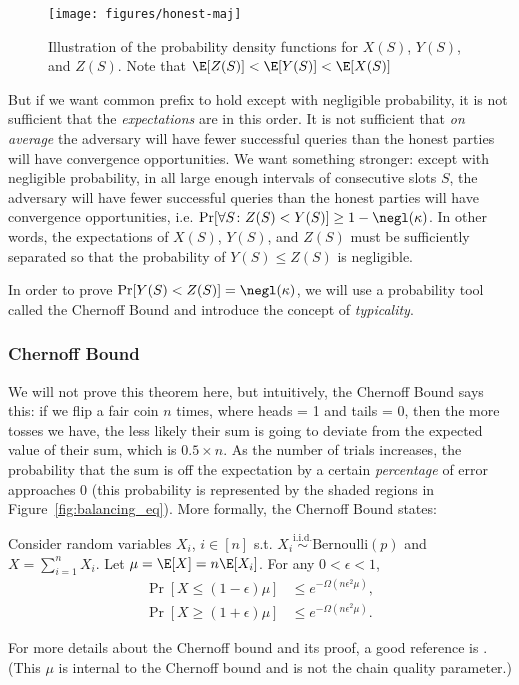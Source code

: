 \begin{figure}[ht]
    \centering
    \texttt{[image: figures/honest-maj]}
    \caption{Illustration of the probability density functions for $X(S)$, $Y(S)$, and $Z(S)$. Note that $\E[Z(S)] < \E[Y(S)] < \E[X(S)]$}
    \label{fig:expectation_gap}
\end{figure}

But if we want common prefix to hold except with negligible probability, it is not sufficient that the \emph{expectations} are in this order. It is not sufficient that \emph{on average} the adversary will have fewer successful queries than the honest parties will have convergence opportunities. We want something stronger: except with negligible probability, in all large enough intervals of consecutive slots $S$, the adversary will have fewer successful queries than the honest parties will have convergence opportunities, i.e. $\Pr[\forall S\colon Z(S) < Y(S)] \geq 1 - \negl(\kappa)$. In other words, the expectations of $X(S)$, $Y(S)$, and $Z(S)$ must be sufficiently separated so that the probability of $Y(S) \leq Z(S)$ is negligible.

In order to prove $\Pr[Y(S) < Z(S)] = \negl(\kappa)$, we will use a probability tool called the Chernoff Bound and introduce the concept of \textit{typicality}.

\subsubsection{Chernoff Bound}

We will not prove this theorem here, but intuitively, the Chernoff Bound says this: if we flip a fair coin $n$ times, where heads = 1 and tails = 0, then the more tosses we have, the less likely their sum is going to deviate from the expected value of their sum, which is $0.5 \times n$. As the number of trials increases, the probability that the sum is off the expectation by a certain \emph{percentage} of error approaches 0 (this probability is represented by the shaded regions in Figure~\ref{fig:balancing_eq}). More formally, the Chernoff Bound states:

\begin{theorem}
Consider random variables ${X_i}$, ${i\in [n]}$ s.t. $X_i \overset{\text{i.i.d.}}{\sim} \mathrm{Bernoulli}(p)$ and $X = \sum_{i=1}^{n} X_i$. Let $\mu = \E[X] = n \E[X_i]$. For any $0 < \epsilon < 1$,
\begin{align}
    \Pr[X \leq (1 - \epsilon) \mu ] &\leq e^{-\Omega(n\epsilon^2\mu)}, \\
    \Pr[X \geq (1 + \epsilon) \mu ] &\leq e^{-\Omega(n\epsilon^2\mu)}.
\end{align}
\end{theorem}
For more details about the Chernoff bound and its proof, a good reference is \cite{chernoff1952measure}.
(This $\mu$ is internal to the Chernoff bound and is not the chain quality parameter.)


